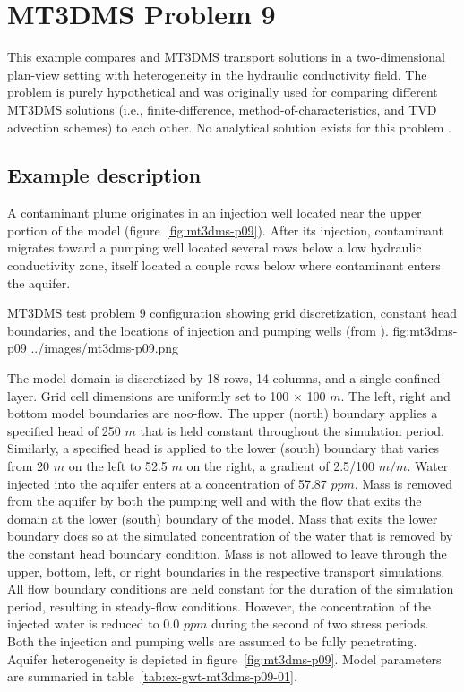 \section{MT3DMS Problem 9}

This example compares \mf and MT3DMS transport solutions in a two-dimensional plan-view setting with heterogeneity in the hydraulic conductivity field. The problem is purely hypothetical and was originally used for comparing different MT3DMS solutions (i.e., finite-difference, method-of-characteristics, and TVD advection schemes) to each other.  No analytical solution exists for this problem \citep{zheng1999mt3dms}.

\subsection{Example description}

A contaminant plume originates in an injection well located near the upper portion of the model (figure~\ref{fig:mt3dms-p09}).  After its injection, contaminant migrates toward a pumping well located several rows below a low hydraulic conductivity zone, itself located a couple rows below where contaminant enters the aquifer. 

\begin{StandardFigure}
	{MT3DMS test problem 9 configuration showing grid discretization, constant head boundaries, and the locations of injection and pumping wells (from \cite{zheng1999mt3dms}).} 
	{fig:mt3dms-p09}
	{../images/mt3dms-p09.png}
\end{StandardFigure}

The model domain is discretized by 18 rows, 14 columns, and a single confined layer.  Grid cell dimensions are uniformly set to 100 $\times$ 100 $m$.  The left, right and bottom model boundaries are noo-flow.  The upper (north) boundary applies a specified head of 250 $m$ that is held constant throughout the simulation period.  Similarly, a specified head is applied to the lower (south) boundary that varies from 20 $m$ on the left to 52.5 $m$ on the right, a gradient of 2.5/100 $m/m$.  Water injected into the aquifer enters at a concentration of 57.87 $ppm$.  Mass is removed from the aquifer by both the pumping well and with the flow that exits the domain at the lower (south) boundary of the model.  Mass that exits the lower boundary does so at the simulated concentration of the water that is removed by the constant head boundary condition.  Mass is not allowed to leave through the upper, bottom, left, or right boundaries in the respective transport simulations.  All flow boundary conditions are held constant for the duration of the simulation period, resulting in steady-flow conditions.  However, the concentration of the injected water is reduced to 0.0 $ppm$ during the second of two stress periods.  Both the injection and pumping wells are assumed to be fully penetrating.  Aquifer heterogeneity is depicted in figure~\ref{fig:mt3dms-p09}.  Model parameters are summaried in table~\ref{tab:ex-gwt-mt3dms-p09-01}.

